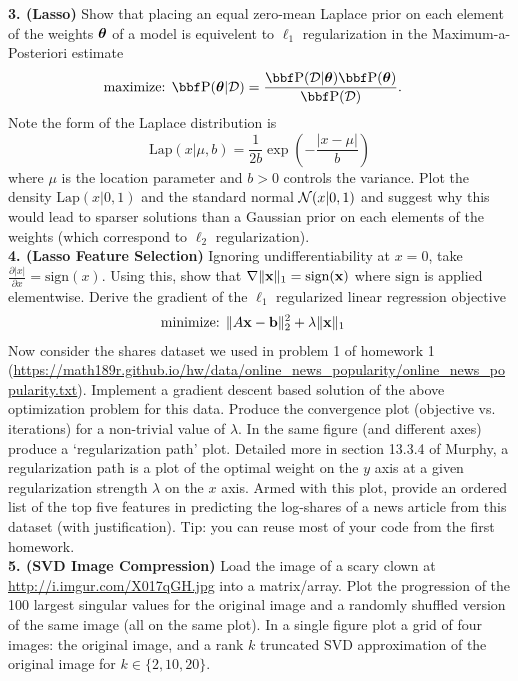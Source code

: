 \documentclass[12pt,letterpaper,fleqn]{hmcpset}
\begin{document}
\textbf{3. (Lasso)} Show that placing an equal zero-mean Laplace prior on each element of the weights $\hbox{\boldmath$\theta$}$
of a model is equivelent to $\ell_1$ regularization in the Maximum-a-Posteriori estimate
\begin{align*}
    \text{maximize: } & \PP(\thetab | \Dc) = \frac{\PP(\Dc | \thetab)\PP(\thetab)}{\PP(\Dc)}.
\end{align*}
Note the form of the Laplace distribution is
\[
    \mathrm{Lap}(x|\mu,b) = \frac{1}{2b}\exp\left(-\frac{|x-\mu|}{b}\right)
\]
where $\mu$ is the location parameter and $b>0$ controls the variance. Plot the density
$\mathrm{Lap}(x|0,1)$ and the standard normal ${\cal N}(x|0,1)$ and suggest why this would
lead to sparser solutions than a Gaussian prior on each elements of the weights
(which correspond to $\ell_2$ regularization).\\[1em]

\textbf{4. (Lasso Feature Selection)} Ignoring undifferentiability at $x=0$, take $\frac{\partial |x|}{\partial x}
= \mathrm{sign} (x)$. Using this, show that $\nabla \|{\bf x}\|_1 = \mathrm{sign}({\bf x})$ where $\mathrm{sign}$ is applied
elementwise. Derive the gradient of the $\ell_1$ regularized linear regression objective
\begin{align*}
    \text{minimize: } & \|A{\bf x} - {\bf b}\|_2^2 + \lambda \|{\bf x}\|_1
\end{align*}
Now consider the shares dataset we used in problem 1 of homework 1
(\url{https://math189r.github.io/hw/data/online_news_popularity/online_news_popularity.txt}).
Implement a gradient descent based solution of the above optimization problem for this data. Produce
the convergence plot (objective vs. iterations) for a non-trivial value of $\lambda$.
In the same figure (and different axes) produce a `regularization path' plot. Detailed
more in section 13.3.4 of Murphy, a regularization path is a plot of the optimal weight on
the $y$ axis at a given regularization strength $\lambda$ on the $x$ axis. Armed with this
plot, provide an ordered list of the top five features in predicting the log-shares of a news
article from this dataset (with justification). Tip: you can reuse most of your code from
the first homework.\\[1em]

\textbf{5. (SVD Image Compression)} Load the image of a scary clown at \url{http://i.imgur.com/X017qGH.jpg}
into a matrix/array. Plot the progression of the 100 largest singular values for the original image
and a randomly shuffled version of the same image (all on the same plot). In a single figure plot
a grid of four images: the original image, and a rank $k$ truncated SVD approximation of the original
image for $k\in\{2,10,20\}$.\\[1em]
\end{document}
